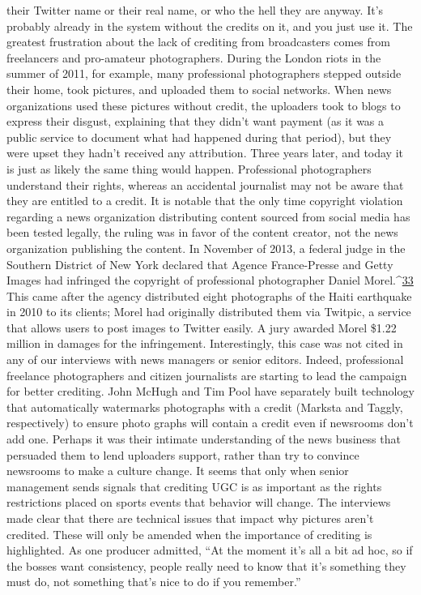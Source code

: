 \begin{enumerate}
their Twitter name or their real name, or who the hell they are anyway.
It's probably already in the system without the credits on it, and
you just use it.
The greatest frustration about the lack of crediting from broadcasters
comes from freelancers and pro-amateur photographers. During the London
riots in the summer of 2011, for example, many professional photographers
stepped outside their home, took pictures, and uploaded them to
social networks. When news organizations used these pictures without
credit, the uploaders took to blogs to express their disgust, explaining that
they didn't want payment (as it was a public service to document what had
happened during that period), but they were upset they hadn't received any
attribution. Three years later, and today it is just as likely the same thing
would happen.
Professional photographers understand their rights, whereas an accidental
journalist may not be aware that they are entitled to a credit. It is notable
that the only time copyright violation regarding a news organization distributing
content sourced from social media has been tested legally, the
ruling was in favor of the content creator, not the news organization publishing
the content. In November of 2013, a federal judge in the Southern
District of New York declared that Agence France-Presse and Getty
Images had infringed the copyright of professional photographer Daniel
Morel.^{\href{#endnotes}{33}} This came after the agency distributed eight photographs of the
Haiti earthquake in 2010 to its clients; Morel had originally distributed
them via Twitpic, a service that allows users to post images to Twitter easily.
A jury awarded Morel \$1.22 million in damages for the infringement.
Interestingly, this case was not cited in any of our interviews with news
managers or senior editors.
Indeed, professional freelance photographers and citizen journalists are
starting to lead the campaign for better crediting. John McHugh and Tim
Pool have separately built technology that automatically watermarks photographs
with a credit (Marksta and Taggly, respectively) to ensure photo
graphs will contain a credit even if newsrooms don't add one. Perhaps it was
their intimate understanding of the news business that persuaded them to
lend uploaders support, rather than try to convince newsrooms to make a
culture change.
It seems that only when senior management sends signals that crediting
UGC is as important as the rights restrictions placed on sports events that
behavior will change. The interviews made clear that there are technical
issues that impact why pictures aren't credited. These will only be amended
when the importance of crediting is highlighted.
As one producer admitted, ``At the moment it's all a bit ad hoc, so if the
bosses want consistency, people really need to know that it's something
they must do, not something that's nice to do if you remember.''


\end{enumerate}
